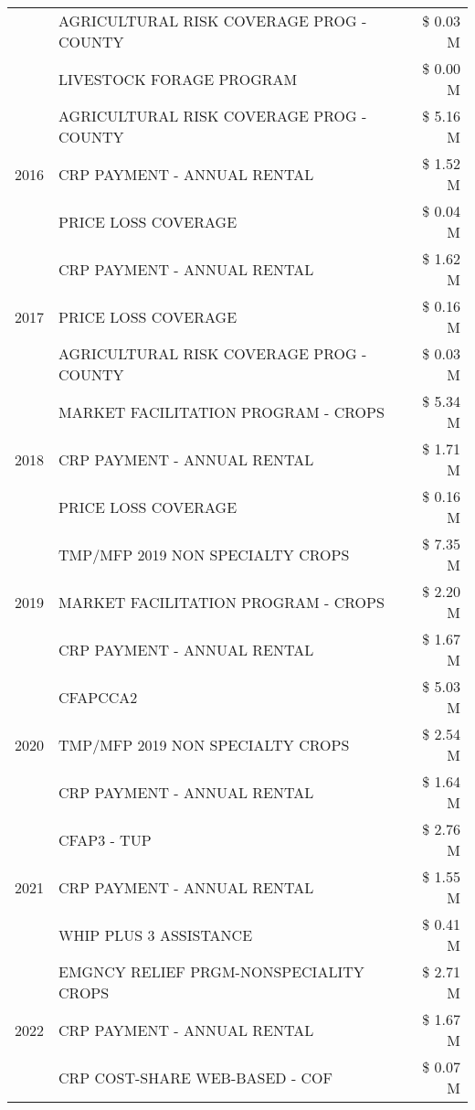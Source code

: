 \begin{tabular}{llr}
 & AGRICULTURAL RISK COVERAGE PROG - COUNTY & \$ 0.03 M \\
 & LIVESTOCK FORAGE PROGRAM & \$ 0.00 M \\
\cline{1-3}
\multirow[t]{3}{*}{2016} & AGRICULTURAL RISK COVERAGE PROG - COUNTY & \$ 5.16 M \\
 & CRP PAYMENT - ANNUAL RENTAL & \$ 1.52 M \\
 & PRICE LOSS COVERAGE & \$ 0.04 M \\
\cline{1-3}
\multirow[t]{3}{*}{2017} & CRP PAYMENT - ANNUAL RENTAL & \$ 1.62 M \\
 & PRICE LOSS COVERAGE & \$ 0.16 M \\
 & AGRICULTURAL RISK COVERAGE PROG - COUNTY & \$ 0.03 M \\
\cline{1-3}
\multirow[t]{3}{*}{2018} & MARKET FACILITATION PROGRAM - CROPS & \$ 5.34 M \\
 & CRP PAYMENT - ANNUAL RENTAL & \$ 1.71 M \\
 & PRICE LOSS COVERAGE & \$ 0.16 M \\
\cline{1-3}
\multirow[t]{3}{*}{2019} & TMP/MFP 2019 NON SPECIALTY CROPS & \$ 7.35 M \\
 & MARKET FACILITATION PROGRAM - CROPS & \$ 2.20 M \\
 & CRP PAYMENT - ANNUAL RENTAL & \$ 1.67 M \\
\cline{1-3}
\multirow[t]{3}{*}{2020} & CFAPCCA2 & \$ 5.03 M \\
 & TMP/MFP 2019 NON SPECIALTY CROPS & \$ 2.54 M \\
 & CRP PAYMENT - ANNUAL RENTAL & \$ 1.64 M \\
\cline{1-3}
\multirow[t]{3}{*}{2021} & CFAP3 - TUP & \$ 2.76 M \\
 & CRP PAYMENT - ANNUAL RENTAL & \$ 1.55 M \\
 & WHIP PLUS 3 ASSISTANCE & \$ 0.41 M \\
\cline{1-3}
\multirow[t]{3}{*}{2022} & EMGNCY RELIEF PRGM-NONSPECIALITY CROPS & \$ 2.71 M \\
 & CRP PAYMENT - ANNUAL RENTAL & \$ 1.67 M \\
 & CRP COST-SHARE WEB-BASED - COF & \$ 0.07 M \\
\cline{1-3}
\bottomrule
\end{tabular}
